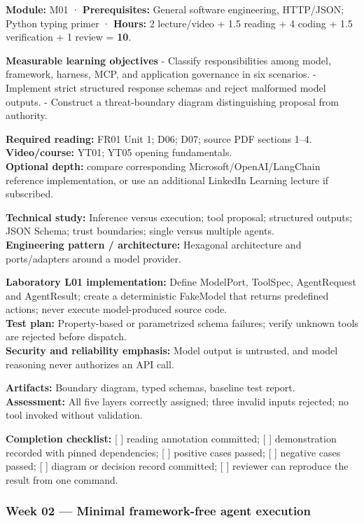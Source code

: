 \documentclass[
  10pt,
]{article}
\begin{document}
\textbf{Module:} M01 · \textbf{Prerequisites:} General software
engineering, HTTP/JSON; Python typing primer · \textbf{Hours:} 2
lecture/video + 1.5 reading + 4 coding + 1.5 verification + 1 review =
\textbf{10}.

\textbf{Measurable learning objectives} - Classify responsibilities
among model, framework, harness, MCP, and application governance in six
scenarios. - Implement strict structured response schemas and reject
malformed model outputs. - Construct a threat-boundary diagram
distinguishing proposal from authority.

\textbf{Required reading:} FR01 Unit 1; D06; D07; source PDF sections
1--4.\\
\textbf{Video/course:} YT01; YT05 opening fundamentals.\\
\textbf{Optional depth:} compare corresponding
Microsoft/OpenAI/LangChain reference implementation, or use an
additional LinkedIn Learning lecture if subscribed.

\textbf{Technical study:} Inference versus execution; tool proposal;
structured outputs; JSON Schema; trust boundaries; single versus
multiple agents.\\
\textbf{Engineering pattern / architecture:} Hexagonal architecture and
ports/adapters around a model provider.

\textbf{Laboratory L01 implementation:} Define ModelPort, ToolSpec,
AgentRequest and AgentResult; create a deterministic FakeModel that
returns predefined actions; never execute model-produced source code.\\
\textbf{Test plan:} Property-based or parametrized schema failures;
verify unknown tools are rejected before dispatch.\\
\textbf{Security and reliability emphasis:} Model output is untrusted,
and model reasoning never authorizes an API call.

\textbf{Artifacts:} Boundary diagram, typed schemas, baseline test
report.\\
\textbf{Assessment:} All five layers correctly assigned; three invalid
inputs rejected; no tool invoked without validation.

\textbf{Completion checklist:} {[} {]} reading annotation committed; {[}
{]} demonstration recorded with pinned dependencies; {[} {]} positive
cases passed; {[} {]} negative cases passed; {[} {]} diagram or decision
record committed; {[} {]} reviewer can reproduce the result from one
command.

\subsubsection{Week 02 --- Minimal framework-free agent
execution}\label{week-02-minimal-framework-free-agent-execution}
\end{document}
